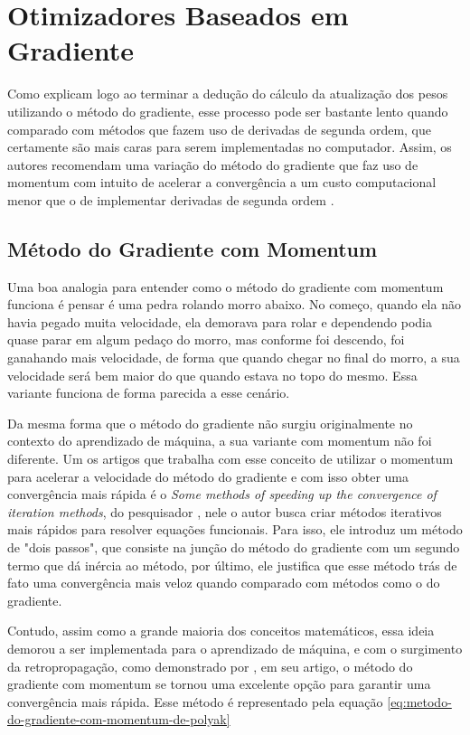 \section{Otimizadores Baseados em Gradiente}

Como \textcite{BackpropagationArticle} explicam logo ao terminar a dedução do cálculo da atualização dos pesos utilizando o método do gradiente, esse processo pode ser bastante lento quando comparado com métodos que fazem uso de derivadas de segunda ordem, que certamente são mais caras para serem implementadas no computador. Assim, os autores recomendam uma variação do método do gradiente que faz uso de momentum com intuito de acelerar a convergência a um custo computacional menor que o de implementar derivadas de segunda ordem \parencite{BackpropagationArticle}.

\subsection{Método do Gradiente com Momentum}

Uma boa analogia para entender como o método do gradiente com momentum funciona é pensar é uma pedra rolando morro abaixo. No começo, quando ela não havia pegado muita velocidade, ela demorava para rolar e dependendo podia quase parar em algum pedaço do morro, mas conforme foi descendo, foi ganahando mais velocidade, de forma que quando chegar no final do morro, a sua velocidade será bem maior do que quando estava no topo do mesmo. Essa variante funciona de forma parecida a esse cenário.

Da mesma forma que o método do gradiente não surgiu originalmente no contexto do aprendizado de máquina, a sua variante com momentum não foi diferente. Um os artigos que trabalha com esse conceito de utilizar o momentum para acelerar a velocidade do método do gradiente e com isso obter uma convergência mais rápida é o \textit{Some methods of speeding up the convergence of iteration methods}, do pesquisador \textcite{polyak1964}, nele o autor busca criar métodos iterativos mais rápidos para resolver equações funcionais. Para isso, ele introduz um método de "dois passos", que consiste na junção do método do gradiente com um segundo termo que dá inércia ao método, por último, ele justifica que esse método trás de fato uma convergência mais veloz quando comparado com métodos como o do gradiente.

Contudo, assim como a grande maioria dos conceitos matemáticos, essa ideia demorou a ser implementada para o aprendizado de máquina, e com o surgimento da retropropagação, como demonstrado por \parencite{BackpropagationArticle}, em seu artigo, o método do gradiente com momentum se tornou uma excelente opção para garantir uma convergência mais rápida. Esse método é representado pela equação \ref{eq:metodo-do-gradiente-com-momentum-de-polyak}

